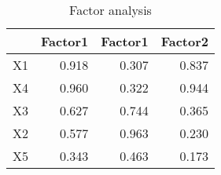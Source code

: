 \begin{table}[ht]
\centering
\begin{tabular}{rrrr}
  \toprule
 & Factor1 & Factor1 & Factor2 \\ 
  \midrule
X1 & 0.918 & 0.307 & 0.837 \\ 
  X4 & 0.960 & 0.322 & 0.944 \\ 
  X3 & 0.627 & 0.744 & 0.365 \\ 
  X2 & 0.577 & 0.963 & 0.230 \\ 
  X5 & 0.343 & 0.463 & 0.173 \\ 
   \bottomrule
\end{tabular}
\caption{Factor analysis} 
\label{tab:fa2}
\end{table}
